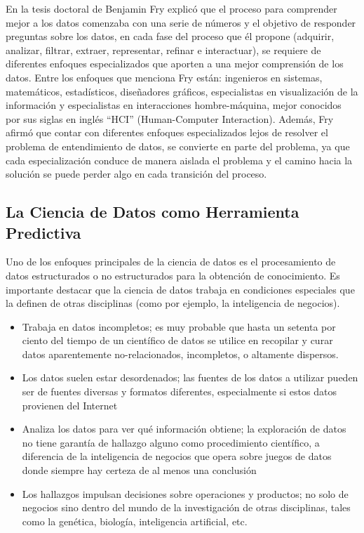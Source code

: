 En la tesis doctoral de Benjamin Fry \cite{fry} explicó que el proceso para comprender mejor a los datos comenzaba con una serie de números y el objetivo de responder preguntas sobre los datos, en cada fase del proceso que él propone (adquirir, analizar, filtrar, extraer, representar, refinar e interactuar), se requiere de diferentes enfoques especializados que aporten a una mejor comprensión de los datos. Entre los enfoques que menciona Fry están: ingenieros en sistemas, matemáticos, estadísticos, diseñadores gráficos, especialistas en visualización de la información y especialistas en interacciones hombre-máquina, mejor conocidos por sus siglas en inglés “HCI” (Human-Computer Interaction). Además, Fry afirmó que contar con diferentes enfoques especializados lejos de resolver el problema de entendimiento de datos, se convierte en parte del problema, ya que cada especialización conduce de manera aislada el problema y el camino hacia la solución se puede perder algo en cada transición del proceso.

\subsection{La Ciencia de Datos como Herramienta Predictiva}
Uno de los enfoques principales de la ciencia de datos es el procesamiento de datos estructurados o no estructurados para la obtención de conocimiento. Es importante destacar que la ciencia de datos trabaja en condiciones especiales que la definen de otras disciplinas (como por ejemplo, la inteligencia de negocios).

\begin{itemize}
	\item Trabaja en datos incompletos; es muy probable que hasta un setenta por ciento del tiempo de un científico de datos se utilice en recopilar y curar datos aparentemente no-relacionados, incompletos, o altamente dispersos.
	\item Los datos suelen estar desordenados; las fuentes de los datos a utilizar pueden ser de fuentes diversas y formatos diferentes, especialmente si estos datos provienen del Internet
	\item Analiza los datos para ver qué información obtiene; la exploración de datos no tiene garantía de hallazgo alguno como procedimiento científico, a diferencia de la inteligencia de negocios que opera sobre juegos de datos donde siempre hay certeza de al menos una conclusión
	\item Los hallazgos impulsan decisiones sobre operaciones y productos; no solo de negocios sino dentro del mundo de la investigación de otras disciplinas, tales como la genética, biología, inteligencia artificial, etc.
\end{itemize}

